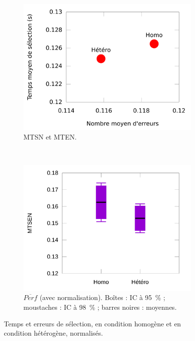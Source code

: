\begin{figure}[htbp]
\begin{subfigure}[t]{0.49\textwidth}
			\includegraphics[width=\textwidth]{figures/ch5/normErrorsTimesScatter}
			\caption{MTSN et MTEN.}
			\label{fig:normErrorsTimesScatter}
		\end{subfigure}
		~
		\begin{subfigure}[t]{0.49\textwidth}
			\centering
			\includegraphics[width=\textwidth]{figures/ch5/normAsProducts}
			\caption{$\overline{Perf}$ (avec normalisation). Boîtes : IC à 95~\%{} ; \og moustaches \fg{} : IC à 98~\%{} ; barres noires : moyennes.}
			\label{fig:normAsProducts}
		\end{subfigure}
		\caption[Temps et erreurs de sélection, homogène vs. hétérogène -- II]{Temps et erreurs de sélection, en condition homogène et en condition hétérogène, normalisés.}
		\label{fig:normAsTimeAndErrors}
	\end{figure}


